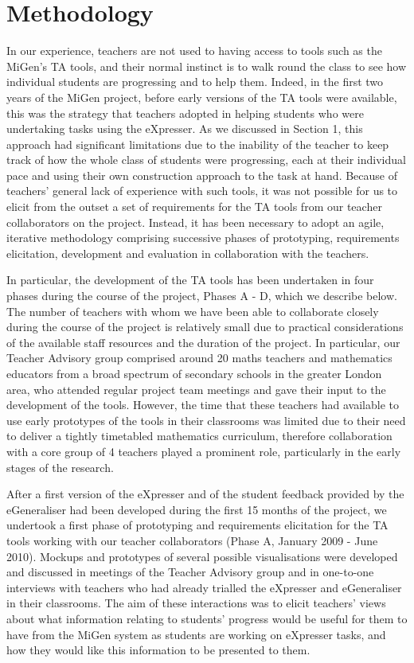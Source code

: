 \section{Methodology}
\label{sec:methodology}

In our experience, teachers are not used to having access to tools
such as the MiGen’s TA tools, and their normal instinct is to walk
round the class to see how individual students are progressing and to
help them.  Indeed, in the first two years of the MiGen project,
before early versions of the TA tools were available, this was the
strategy that teachers adopted in helping students who were
undertaking tasks using the eXpresser.  As we discussed in Section 1,
this approach had significant limitations due to the inability of the
teacher to keep track of how the whole class of students were
progressing, each at their individual pace and using their own
construction approach to the task at hand. Because of teachers’
general lack of experience with such tools, it was not possible for us
to elicit from the outset a set of requirements for the TA tools from
our teacher collaborators on the project. Instead, it has been
necessary to adopt an agile, iterative methodology comprising
successive phases of prototyping, requirements elicitation,
development and evaluation in collaboration with the teachers. 

In particular, the development of the TA tools has been undertaken in
four phases during the course of the project, Phases A - D, which we
describe below. The number of teachers with whom we have been able to
collaborate closely during the course of the project is relatively
small due to practical considerations of the available staff resources
and the duration of the project. In particular, our Teacher Advisory
group comprised around 20 maths teachers and mathematics educators
from a broad spectrum of secondary schools in the greater London area,
who attended regular project team meetings and gave their input to the
development of the tools. However, the time that these teachers had
available to use early prototypes of the tools in their classrooms was
limited due to their need to deliver a tightly timetabled mathematics
curriculum, therefore collaboration with a core group of 4 teachers
played a prominent role, particularly in the early stages of the
research.
 
After a first version of the eXpresser and of the student feedback
provided by the eGeneraliser had been developed during the first 15
months of the project, we undertook a first phase of prototyping and
requirements elicitation for the TA tools working with our teacher
collaborators (Phase A, January 2009 - June 2010). Mockups and
prototypes of several possible visualisations were developed and
discussed in meetings of the Teacher Advisory group and in one-to-one
interviews with teachers who had already trialled the eXpresser and
eGeneraliser in their classrooms. The aim of these interactions was to
elicit teachers’ views about what information relating to students’
progress would be useful for them to have from the MiGen system as
students are working on eXpresser tasks, and how they would like this
information to be presented to them.
  
